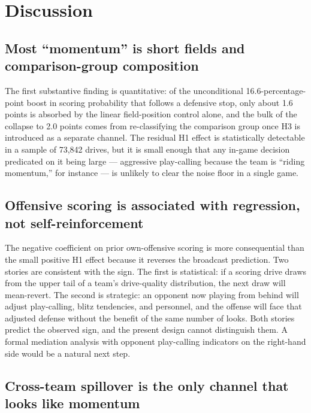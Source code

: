 \documentclass[11pt]{article}
\begin{document}
\section{Discussion}\label{sec:discuss}

\subsection{Most ``momentum'' is short fields and comparison-group composition}

The first substantive finding is quantitative: of the unconditional
16.6-percentage-point boost in scoring probability that follows a defensive
stop, only about 1.6 points is absorbed by the linear field-position control
alone, and the bulk of the collapse to 2.0 points comes from re-classifying
the comparison group once H3 is introduced as a separate channel. The
residual H1 effect is statistically detectable in a sample of 73{,}842
drives, but it is small enough that any in-game decision predicated on it
being large --- aggressive play-calling because the team is ``riding
momentum,'' for instance --- is unlikely to clear the noise floor in a
single game.

\subsection{Offensive scoring is associated with regression, not self-reinforcement}

The negative coefficient on prior own-offensive scoring is more consequential
than the small positive H1 effect because it reverses the broadcast
prediction. Two stories are consistent with the sign. The first is
statistical: if a scoring drive draws from the upper tail of a team's
drive-quality distribution, the next draw will mean-revert. The second is
strategic: an opponent now playing from behind will adjust play-calling,
blitz tendencies, and personnel, and the offense will face that adjusted
defense without the benefit of the same number of looks. Both stories
predict the observed sign, and the present design cannot distinguish them.
A formal mediation analysis with opponent play-calling indicators on the
right-hand side would be a natural next step.

\subsection{Cross-team spillover is the only channel that looks like momentum}
\end{document}
